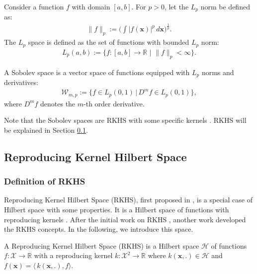 \documentclass[lang=cn,10pt]{gorgeousnbook}
\numberwithin{equation}{section}%
\numberwithin{figure}{section}%
\begin{document}
\begin{definition}[$L_p$ Space]
Consider a function $f$ with domain $[a, b]$. 
For $p >0$, let the $L_p$ norm be defined as:
\begin{align}
\|f\|_p := \Big(\int |f(\boldsymbol{x})|^p\, d\boldsymbol{x}\Big)^{\frac{1}{p}}.
\end{align}
The $L_p$ space is defined as the set of functions with bounded $L_p$ norm:
\begin{align}
L_p(a,b) := \{f:[a,b] \rightarrow \mathbb{R}\,\, |\,\, \|f\|_p < \infty \}.
\end{align}
\end{definition}

\begin{definition}
A Sobolev space is a vector space of functions equipped with $L_p$ norms and derivatives:
\begin{align}
\mathcal{W}_{m,p} := \{f \in L_p(0,1)\, |\, D^m f \in L_p(0,1) \},
\end{align}
where $D^m f$ denotes the $m$-th order derivative. 
\end{definition}
Note that the Sobolev spaces are RKHS with some specific kernels \cite{novak2018reproducing}. RKHS will be explained in Section \ref{section_RKHS}.

\subsection{Reproducing Kernel Hilbert Space}\label{section_RKHS}

\subsubsection{Definition of RKHS}

Reproducing Kernel Hilbert Space (RKHS), first proposed in \cite{aronszajn1950theory}, is a special case of Hilbert space with some properties. It is a Hilbert space of functions with reproducing kernels \cite{berlinet2011reproducing}. 
After the initial work on RKHS \cite{aronszajn1950theory}, another work \cite{aizerman1964theoretical} developed the RKHS concepts.
In the following, we introduce this space. 

\begin{definition}\label{definition_RKHS}
A Reproducing Kernel Hilbert Space (RKHS) is a Hilbert space $\mathcal{H}$ of functions $f: \mathcal{X} \rightarrow \mathbb{R}$ with a reproducing kernel $k: \mathcal{X}^2 \rightarrow \mathbb{R}$ where $k(\boldsymbol{x}, .) \in \mathcal{H}$ and $f(\boldsymbol{x}) = \langle\,k(\boldsymbol{x},.),f\rangle$. 
\end{definition}
\end{document}
